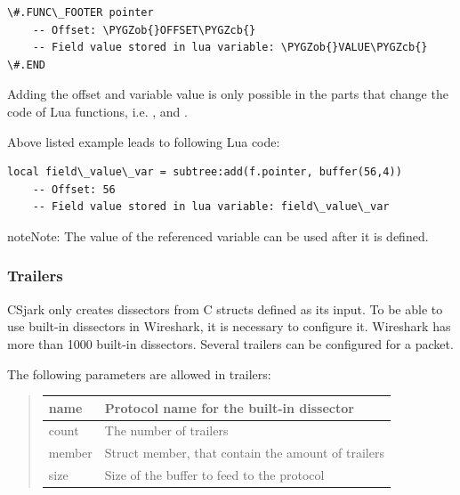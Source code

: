 \documentclass[A4paper,10pt,english]{sphinxmanual}
\def\PYGZob{\char`\{}
\def\PYGZcb{\char`\}}
\begin{document}
\begin{Verbatim}[commandchars=\\\{\}]
\#.FUNC\_FOOTER pointer
    -- Offset: \PYGZob{}OFFSET\PYGZcb{}
    -- Field value stored in lua variable: \PYGZob{}VALUE\PYGZcb{}
\#.END
\end{Verbatim}

Adding the offset and variable value is only possible in the parts that change the code of Lua functions, i.e. ,  and .

Above listed example leads to following Lua code:

\begin{Verbatim}[commandchars=\\\{\}]
local field\_value\_var = subtree:add(f.pointer, buffer(56,4))
    -- Offset: 56
    -- Field value stored in lua variable: field\_value\_var
\end{Verbatim}

\begin{notice}{note}{Note:}
The value of the referenced variable can be used after it is defined.
\end{notice}


\subsubsection{Trailers}
\label{user/config:trailers}
CSjark only creates dissectors from C structs defined as its input. To be able to use built-in dissectors in Wireshark, it is necessary to configure it. Wireshark has more than 1000 built-in dissectors. Several trailers can be configured for a packet.

The following parameters are allowed in trailers:
\begin{quote}

\begin{tabulary}{\linewidth}{|L|L|}
\hline

name
 & 
Protocol name for the built-in dissector
\\\hline

count
 & 
The number of trailers
\\\hline

member
 & 
Struct member, that contain the amount of trailers
\\\hline

size
 & 
Size of the buffer to feed to the protocol
\\\hline
\end{tabulary}

\end{quote}
\end{document}
